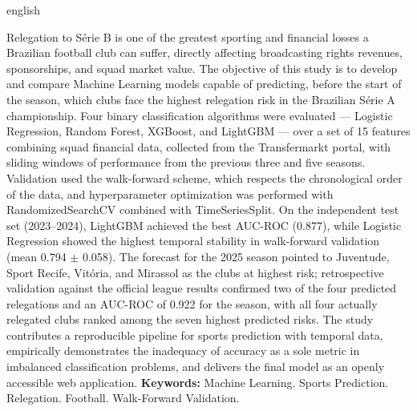 \documentclass[
    article,
    12pt,
    oneside,
    a4paper,
    english,
    brazilian
    ]{abntex2}
\begin{document}
\begin{otherlanguage*}{english}
\begin{resumo}[Abstract]
\noindent Relegation to Série B is one of the greatest sporting and financial losses a Brazilian football club can suffer, directly affecting broadcasting rights revenues, sponsorships, and squad market value. The objective of this study is to develop and compare Machine Learning models capable of predicting, before the start of the season, which clubs face the highest relegation risk in the Brazilian Série A championship. Four binary classification algorithms were evaluated --- Logistic Regression, Random Forest, XGBoost, and LightGBM --- over a set of 15 features combining squad financial data, collected from the Transfermarkt portal, with sliding windows of performance from the previous three and five seasons. Validation used the walk-forward scheme, which respects the chronological order of the data, and hyperparameter optimization was performed with RandomizedSearchCV combined with TimeSeriesSplit. On the independent test set (2023--2024), LightGBM achieved the best AUC-ROC (0.877), while Logistic Regression showed the highest temporal stability in walk-forward validation (mean 0.794 $\pm$ 0.058). The forecast for the 2025 season pointed to Juventude, Sport Recife, Vitória, and Mirassol as the clubs at highest risk; retrospective validation against the official league results confirmed two of the four predicted relegations and an AUC-ROC of 0.922 for the season, with all four actually relegated clubs ranked among the seven highest predicted risks. The study contributes a reproducible pipeline for sports prediction with temporal data, empirically demonstrates the inadequacy of accuracy as a sole metric in imbalanced classification problems, and delivers the final model as an openly accessible web application.
\newline
\noindent \textbf{Keywords:} Machine Learning. Sports Prediction. Relegation. Football. Walk-Forward Validation.
\end{resumo}
\end{otherlanguage*}
\newpage

\listoffigures*

\vspace{1.5cm}

\listoftables*
\newpage
\end{document}
